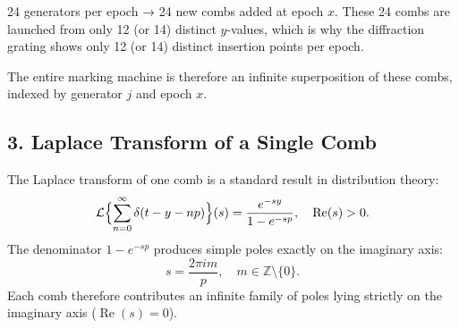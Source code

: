 \documentclass[11pt,a4paper]{article}
\begin{document}
24 generators per epoch → 24 new combs added at epoch $  x  $.
These 24 combs are launched from only 12 (or 14) distinct $  y  $-values, which is why the diffraction grating shows only 12 (or 14) distinct insertion points per epoch.

The entire marking machine is therefore an infinite superposition of these combs, indexed by generator $  j  $ and epoch $  x  $.
\subsection{3. Laplace Transform of a Single Comb}
The Laplace transform of one comb is a standard result in distribution theory:
$$\mathcal{L}\Bigl\{\sum_{n=0}^\infty \delta(t - y - n p)\Bigr\}(s) = \frac{e^{-s y}}{1 - e^{-s p}}, \quad \operatorname{Re}(s) > 0.$$
The denominator $  1 - e^{-s p}  $ produces simple poles exactly on the imaginary axis:
$$s = \frac{2\pi i m}{p}, \quad m \in \mathbb{Z} \setminus \{0\}.$$
Each comb therefore contributes an infinite family of poles lying strictly on the imaginary axis ($  \operatorname{Re}(s) = 0  $).
\end{document}
